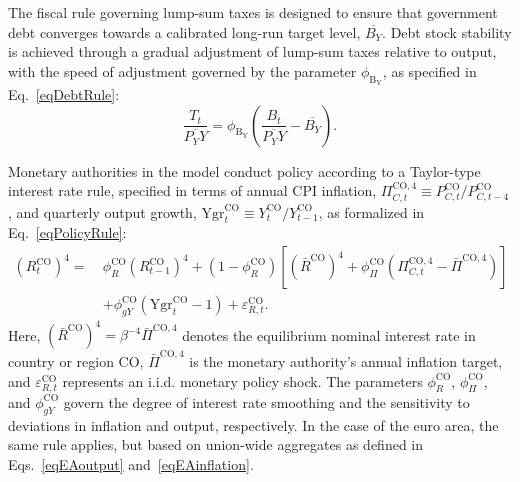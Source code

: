 \documentclass[a4paper,11pt]{article}
\numberwithin{equation}{section}
\begin{document}
The fiscal rule governing lump-sum taxes is designed to ensure that government debt converges towards a calibrated long-run target level, $\overline{B_Y}$. 
Debt stock stability is achieved through a gradual adjustment of lump-sum taxes relative to output, with the speed of adjustment governed by the parameter $\phi_{\text{B}_{\text{Y}}}$, as specified in Eq.~\ref{eqDebtRule}:
\begin{equation}
    \label{eqDebtRule}
    \frac{T_t}{\overline{P_Y Y}} = \phi_{\text{B}_{\text{Y}}} \left( \frac{B_t}{\overline{P_Y Y}} - \overline{B_Y} \right).
\end{equation}


Monetary authorities in the model conduct policy according to a Taylor-type interest rate rule, specified in terms of annual CPI inflation, $\Pi_{C,t}^{\mathrm{CO},4} \equiv P_{C,t}^{\mathrm{CO}} / P_{C,t-4}^{\mathrm{CO}}$, and quarterly output growth, $\mathrm{Ygr}_t^{\mathrm{CO}} \equiv Y_t^{\mathrm{CO}} / Y_{t-1}^{\mathrm{CO}}$, as formalized in Eq.~\ref{eqPolicyRule}:
\begin{equation} \label{eqPolicyRule}
    \begin{aligned}
    \left(R_t^{\mathrm{CO}}\right)^4 =\ & \phi_{R}^{\mathrm{CO}} \left(R_{t-1}^{\mathrm{CO}}\right)^4 
    + \left(1-\phi_{R}^{\mathrm{CO}}\right) \left[\left(\bar{R}^{\mathrm{CO}}\right)^4 
    + \phi_{\Pi}^{\mathrm{CO}} \left(\Pi_{C,t}^{\mathrm{CO},4} - \bar{\Pi}^{\mathrm{CO},4}\right)\right] \\
    & + \phi_{gY}^{\mathrm{CO}} \left(\mathrm{Ygr}_t^{\mathrm{CO}} - 1\right)
    + \varepsilon_{R,t}^{\mathrm{CO}}.
    \end{aligned}
\end{equation}
Here, $\left(\bar{R}^{\mathrm{CO}}\right)^4 = \beta^{-4} \bar{\Pi}^{\mathrm{CO},4}$ denotes the equilibrium nominal interest rate in country or region $\mathrm{CO}$, $\bar{\Pi}^{\mathrm{CO},4}$ is the monetary authority's annual inflation target, and $\varepsilon_{R,t}^{\mathrm{CO}}$ represents an i.i.d. monetary policy shock. 
The parameters $\phi_{R}^{\mathrm{CO}}$, $\phi_{\Pi}^{\mathrm{CO}}$, and $\phi_{gY}^{\mathrm{CO}}$ govern the degree of interest rate smoothing and the sensitivity to deviations in inflation and output, respectively.
In the case of the euro area, the same rule applies, but based on union-wide aggregates as defined in Eqs.~\ref{eqEAoutput} and~\ref{eqEAinflation}.
\end{document}
